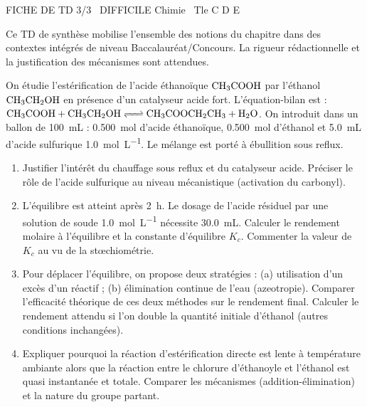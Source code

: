 \documentclass[11pt]{article}
\begin{document}
\begin{tcolorbox}[enhanced,colback=popink,colframe=popink,arc=10pt,boxrule=0pt,left=12pt,right=12pt,top=9pt,bottom=9pt]
{\color{white}\popxbold\small FICHE DE TD 3/3 \textbullet\ DIFFICILE \hfill Chimie \textbullet\ Tle C D E\par}
\end{tcolorbox}
\vspace{4pt}
Ce TD de synthèse mobilise l'ensemble des notions du chapitre dans des contextes intégrés de niveau Baccalauréat/Concours. La rigueur rédactionnelle et la justification des mécanismes sont attendues.

\begin{exercice}
On étudie l'estérification de l'acide éthanoïque $\ce{CH3COOH}$ par l'éthanol $\ce{CH3CH2OH}$ en présence d'un catalyseur acide fort. L'équation-bilan est :
$\ce{CH3COOH + CH3CH2OH <=> CH3COOCH2CH3 + H2O}$.
On introduit dans un ballon de \SI{100}{\mL} : \SI{0,500}{\mol} d'acide éthanoïque, \SI{0,500}{\mol} d'éthanol et \SI{5,0}{\mL} d'acide sulfurique \SI{1,0}{\mol\per\L}. Le mélange est porté à ébullition sous reflux.
\begin{enumerate}
    \item Justifier l'intérêt du chauffage sous reflux et du catalyseur acide. Préciser le rôle de l'acide sulfurique au niveau mécanistique (activation du carbonyl).
    \item L'équilibre est atteint après \SI{2}{\hour}. Le dosage de l'acide résiduel par une solution de soude \SI{1,0}{\mol\per\L} nécessite \SI{30,0}{\mL}. Calculer le rendement molaire à l'équilibre et la constante d'équilibre $K_c$. Commenter la valeur de $K_c$ au vu de la stœchiométrie.
    \item Pour déplacer l'équilibre, on propose deux stratégies : (a) utilisation d'un excès d'un réactif ; (b) élimination continue de l'eau (azeotropie). Comparer l'efficacité théorique de ces deux méthodes sur le rendement final. Calculer le rendement attendu si l'on double la quantité initiale d'éthanol (autres conditions inchangées).
    \item Expliquer pourquoi la réaction d'estérification directe est lente à température ambiante alors que la réaction entre le chlorure d'éthanoyle et l'éthanol est quasi instantanée et totale. Comparer les mécanismes (addition-élimination) et la nature du groupe partant.
\end{enumerate}
\end{exercice}
\end{document}
